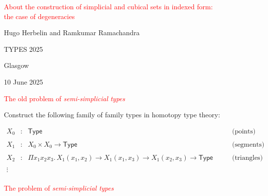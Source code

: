 \documentclass[12pt,landscape]{article}
\newcommand{\Type}{\mathsf{Type}}
\begin{document}
\begin{LARGE}
\begin{sf}

\mbox{}
\vspace{3cm}

\begin{center}

\textcolor{red}{\Huge About the construction of simplicial and cubical
  sets in indexed form:\\ the case of degeneracies}

\medskip
\bigskip
\bigskip
{\Large Hugo Herbelin and Ramkumar Ramachandra}

\bigskip
\bigskip
\bigskip
\bigskip
\bigskip
\bigskip
\bigskip
TYPES 2025

\bigskip
\bigskip
Glasgow
\bigskip

10 June 2025

\bigskip
\bigskip

\end{center}

\newcommand{\mysem}[1]{\llbracket #1 \rrbracket}
\newcommand{\deppsh}[2]{\mathsf{DepPresheaf}(#1,#2)}
\newcommand{\HSet}{\mathsf{HSet}}
\newcommand{\imp}{\rightarrow}

\newpage

\begin{center}
\textcolor{red}{\huge The old problem of \emph{semi-simplicial types}}
\end{center}

\bigskip
\bigskip
Construct the following family of family types in homotopy type theory:

$$
\begin{array}{cllccllll}
X_0 & : & \Type & \mbox{(points)}\\
\\
X_1 & : & X_0 \times X_0 \rightarrow \Type & \mbox{(segments)}\\
\\
X_2 & : & \Pi x_1x_2x_3.\, X_1 (x_1,x_2) \imp X_1 (x_1,x_3) \imp X_1 (x_2,x_3)\rightarrow \Type \qquad & \mbox{(triangles)}\\
\\
\vdots\\
\end{array}
$$

\newpage

\begin{center}
\textcolor{red}{\huge The problem of \emph{semi-simplicial types}}
\end{center}


\end{sf}
\end{LARGE}
\end{document}
